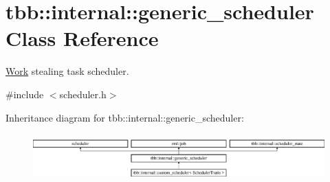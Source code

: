 \hypertarget{classtbb_1_1internal_1_1generic__scheduler}{}\section{tbb\+:\+:internal\+:\+:generic\+\_\+scheduler Class Reference}
\label{classtbb_1_1internal_1_1generic__scheduler}


\hyperlink{structWork}{Work} stealing task scheduler.  




{\ttfamily \#include $<$scheduler.\+h$>$}

Inheritance diagram for tbb\+:\+:internal\+:\+:generic\+\_\+scheduler\+:\begin{figure}[H]
\begin{center}
\leavevmode
\includegraphics[height=1.830065cm]{classtbb_1_1internal_1_1generic__scheduler}
\end{center}
\end{figure}
